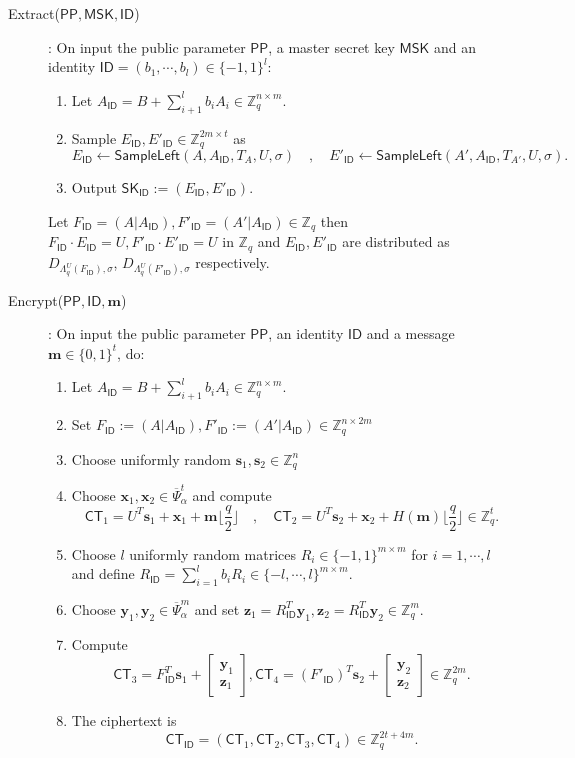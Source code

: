 \documentclass[runningheads]{llncs}
\def\ZZ{\mathbb{Z}}
\def\bf{\mathbf}
\def\SK{\mathsf{SK}}
\def\PP{\mathsf{PP}}
\def\MSK{\mathsf{MSK}}
\def\CT{\mathsf{CT}}
\def\SampleLeft{\mathsf{SampleLeft}}
\def\ID{\mathsf{ID}}
\begin{document}
\begin{description}
		\item[Extract($\PP,\MSK,\ID$)]: On input the public parameter $\PP$, a master secret key $\MSK$ and an identity $\ID=(b_1,\cdots,b_l)\in\{-1,1\}^l$:
		\begin{enumerate}
			\item Let $A_{\ID} =B + \sum_{i+1}^lb_iA_i\in\ZZ_q^{n\times m}$.
			\item Sample $E_{\ID}, E'_{\ID}\in\ZZ_q^{2m\times t}$ as 
			$$E_{\ID}\gets\SampleLeft(A,A_{\ID},T_A,U,\sigma)\quad,\quad E'_{\ID}\gets\SampleLeft(A',A_{\ID},T_{A'},U,\sigma).$$
			\item Output $\SK_\ID:=(E_{\ID},E'_{\ID})$.
		\end{enumerate}
		Let $F_\ID=(A|A_\ID), F'_\ID=(A'|A_\ID)\in\ZZ_q$ then $F_\ID\cdot E_{\ID} = U, F'_\ID\cdot E'_{\ID} = U $ in $\ZZ_q$ and $E_{\ID},E'_{\ID}$ are distributed as $D_{\Lambda_q^U(F_\ID),\sigma}$, $D_{\Lambda_q^U(F'_\ID),\sigma}$ respectively.
		\item[Encrypt($\PP,\ID,\bf{m}$)]: On input the public parameter $\PP$, an identity $\ID$ and a message $\bf{m}\in\{0,1\}^t$, do:
		\begin{enumerate}
			\item Let $A_{\ID} =B + \sum_{i+1}^lb_iA_i\in\ZZ_q^{n\times m}$.
			\item Set $F_\ID:=(A|A_\ID), F'_\ID:=(A'|A_\ID)\in\ZZ_q^{n\times 2m}$
			\item Choose uniformly random $\bf{s}_1, \bf{s}_2\in\ZZ_q^n$
			\item Choose $\bf{x}_1,\bf{x}_2\in\overline{\Psi}_\alpha^t$ and compute
			$$\CT_1 = U^T\bf{s}_1 +\bf{x}_1 +\bf{m}\big\lfloor\frac{q}{2}\big\rfloor\quad,\quad
			\CT_2 = U^T\bf{s}_2 +\bf{x}_2 +H(\bf{m})\big\lfloor\frac{q}{2}\big\rfloor \in\ZZ_q^t.$$
			\item Choose $l$ uniformly random matrices $R_i\in\{-1,1\}^{m\times m}$ for $i=1,\cdots,l$ and define $R_\ID=\sum_{i=1}^lb_iR_i\in\{-l,\cdots,l\}^{m\times m}$.
			\item Choose $\bf{y}_1, \bf{y}_2\in\overline{\Psi}_\alpha^m$ and set $\bf{z}_1=R_\ID^T\bf{y}_1, \bf{z}_2=R_\ID^T\bf{y}_2\in\ZZ_q^m$.
			\item Compute
			$$\CT_3=F_\ID^T\bf{s}_1+\left[\begin{array}{c}\bf{y}_1\\ \bf{z}_1\end{array}\right], \CT_4=(F'_\ID)^T\bf{s}_2+\left[\begin{array}{c}\bf{y}_2\\ \bf{z}_2\end{array}\right]\in\ZZ_q^{2m}.$$
			\item The ciphertext is $$\CT_\ID=(\CT_1,\CT_2,\CT_3,\CT_4)\in\ZZ_q^{2t+4m}.$$    
		\end{enumerate}
		

\end{description}
\end{document}
